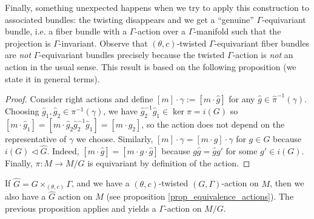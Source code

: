 Finally, something unexpected happens when we try to apply this construction to associated bundles: the twisting disappears and we get a ``genuine'' \(\Gamma\)-equivariant bundle, i.e. a fiber bundle with a \(\Gamma\)-action over a \(\Gamma\)-manifold such that the projection is \(\Gamma\)-invariant. Observe that \((\theta,c)\)-twisted \(\Gamma\)-equivariant fiber bundles are \textit{not} \(\Gamma\)-equivariant bundles precisely because the twisted \(\Gamma\)-action is \textit{not} an action in the usual sense. This result is based on the following proposition (we state it in general terms).

\begin{proof}
    Consider right actions and define \([m]\cdot \gamma:=[m\cdot \hat{g}]\) for any \(\hat{g}\in \hat{\pi}^{-1}(\gamma)\). Choosing \(\hat{g}_1, \hat{g}_2 \in \pi^{-1}(\gamma)\), we have \(\hat{g}_2^{-1} \hat{g}_1\in \ker\pi = i(G)\) so \([m\cdot \hat{g}_1]=[m\cdot \hat{g}_2\hat{g}_2^{-1}\hat{g}_1]=[m\cdot \hat{g}_2]\), so the action does not depend on the representative of \(\gamma\) we choose. Similarly, \([m]\cdot \gamma=[m\cdot g]\cdot \gamma\) for \(g\in G\) because \(i(G) \triangleleft \hat{G}\). Indeed, \([m\cdot \hat{g}]=[m\cdot g \cdot \hat{g}]\) because \(g\hat{g}=\hat{g}g'\) for some \(g'\in i(G)\). Finally, \(\pi\colon M \to M/G\) is equivariant by definition of the action.
\end{proof}

If \(\hat{G}=G \times_{(\theta, c)}\Gamma\), and we have a \((\theta,c)\)-twisted \((G, \Gamma)\)-action on \(M\), then we also have a \(\hat{G}\) action on \(M\) (see proposition \ref{prop_equivalence_actions}). The previous proposition applies and yields a \(\Gamma\)-action on \(M/G\).

